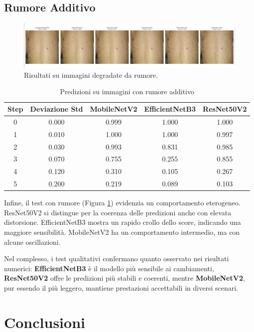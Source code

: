 \subsection{Rumore Additivo}
\begin{figure}[H]
    \centering
    \includegraphics[width=\textwidth]{imgs/noisiness.png}
    \caption{Risultati su immagini degradate da rumore.}
    \label{fig:noise}
\end{figure}
\begin{table}[H]
\centering
\caption{Predizioni su immagini con rumore additivo}
\begin{tabular}{c|c|c|c|c}
\toprule
\textbf{Step} & \textbf{Deviazione Std} & \textbf{MobileNetV2} & \textbf{EfficientNetB3} & \textbf{ResNet50V2} \\
\midrule
0 & 0.000 & 0.999 & 1.000 & 1.000 \\
1 & 0.010 & 1.000 & 1.000 & 0.997 \\
2 & 0.030 & 0.993 & 0.831 & 0.985 \\
3 & 0.070 & 0.755 & 0.255 & 0.855 \\
4 & 0.120 & 0.310 & 0.105 & 0.267 \\
5 & 0.200 & 0.219 & 0.089 & 0.103 \\
\bottomrule
\end{tabular}
\end{table}
Infine, il test con rumore (Figura \ref{fig:noise}) evidenzia un comportamento eterogeneo. ResNet50V2 si distingue per la coerenza delle predizioni anche con elevata distorsione. EfficientNetB3 mostra un rapido crollo dello score, indicando una maggiore sensibilità. MobileNetV2 ha un comportamento intermedio, ma con alcune oscillazioni.

\bigskip
Nel complesso, i test qualitativi confermano quanto osservato nei risultati numerici: \textbf{EfficientNetB3} è il modello più sensibile ai cambiamenti, \textbf{ResNet50V2} offre le predizioni più stabili e coerenti, mentre \textbf{MobileNetV2}, pur essendo il più leggero, mantiene prestazioni accettabili in diversi scenari.
\section{Conclusioni}

